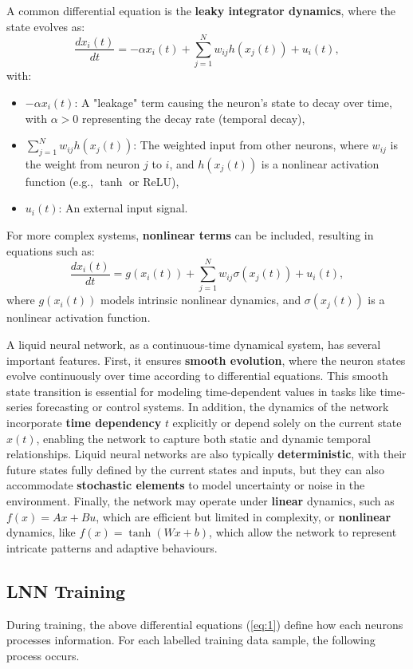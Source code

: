 A common differential equation is the \textbf{leaky integrator dynamics}, where the state evolves as:
\[
\frac{dx_i(t)}{dt} = -\alpha x_i(t) + \sum_{j=1}^N w_{ij} h(x_j(t)) + u_i(t),
\]
with:
\begin{itemize}
    \item \(-\alpha x_i(t)\): A "leakage" term causing the neuron’s state to decay over time, with \(\alpha > 0\) representing the decay rate (temporal decay),
    \item \(\sum_{j=1}^N w_{ij} h(x_j(t))\): The weighted input from other neurons, where \(w_{ij}\) is the weight from neuron \(j\) to \(i\), and \(h(x_j(t))\) is a nonlinear activation function (e.g., \(\tanh\) or ReLU),
    \item \(u_i(t)\): An external input signal.
\end{itemize}

For more complex systems, \textbf{nonlinear terms} can be included, resulting in equations such as:
\[
\frac{dx_i(t)}{dt} = g(x_i(t)) + \sum_{j=1}^N w_{ij} \sigma(x_j(t)) + u_i(t),
\]
where \(g(x_i(t))\) models intrinsic nonlinear dynamics, and \(\sigma(x_j(t))\) is a nonlinear activation function.

A liquid neural network, as a continuous-time dynamical system, has several important features. First, it ensures \textbf{smooth evolution}, where the neuron states evolve continuously over time according to differential equations. This smooth state transition is essential for modeling time-dependent values in tasks like time-series forecasting or control systems. In addition, the dynamics of the network incorporate \textbf{time dependency} \(t\) explicitly or depend solely on the current state \(x(t)\), enabling the network to capture both static and dynamic temporal relationships. Liquid neural networks are also typically \textbf{deterministic}, with their future states fully defined by the current states and inputs, but they can also accommodate \textbf{stochastic elements} to model uncertainty or noise in the environment. Finally, the network may operate under \textbf{linear} dynamics, such as \(f(x) = Ax + Bu\), which are efficient but limited in complexity, or \textbf{nonlinear} dynamics, like \(f(x) = \tanh(Wx + b)\), which allow the network to represent intricate patterns and adaptive behaviours.

\subsection*{LNN Training}
During training, the above differential equations (\ref{eq:1}) define how each neurons processes information. For each labelled training data sample, the following process occurs.

